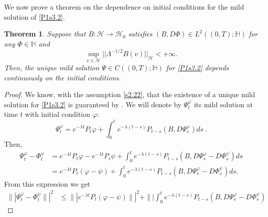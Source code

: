 \documentclass[]{interact}
\theoremstyle{plain}%
\newtheorem{theorem}{Theorem}[section]
\theoremstyle{definition}
\theoremstyle{remark}
\begin{document}
 We now prove a theorem on the dependence on initial conditions for the mild
solution of \eqref{P1s3.2}.
    \begin{theorem}
        \label{Cont-Mild-Sol}
        Suppose that 
        $B:
            \mathcal{H}
            \rightarrow 
            \mathcal{H}_0
        $ satisfies 
        $(B,D\Phi)\in L^2((0,T);\mathbb{H})$ 
        for any $\Phi\in\mathbb{H}$ and
        \begin{equation}\label{s2.22}
            \sup_{v\in \mathcal{H}} 
            ||\Lambda^{-1/2}B(v)||_{\mathcal{H}}<+\infty.
        \end{equation}
        Then, the unique mild solution $\Psi\in C((0,T); \mathbb{H})$ for
        \eqref{P1s3.2} depends continuously on the initial conditions.
    \end{theorem}
    \begin{proof}
        We know, with the assumption \eqref{s2.22}, that the existence of a 
        unique mild solution for \eqref{P1s3.2} is guaranteed by
        . We will denote by $\Psi_t^\varphi$ its mild solution at 
        time $t$ with initial condition $\varphi$:
        \begin{equation*}
            \Psi_t^\varphi
            =   e^{-\lambda t} P_t  
            \varphi
            +  
            \int_0^t e^{-\lambda (t-s)} P_{t-s}
            (B,D\Psi_s^\varphi) ds \ .
        \end{equation*}
        Then,
        \begin{align*}
            \Psi_t^\varphi-\Phi_t^\psi
                &=  
                e^{-\lambda t} P_t \varphi -e^{-\lambda t} P_t
                \psi +
                \int_0^t 
                e^{-\lambda (t-s)}
                P_{t-s}(B,D\Psi_s^\varphi-D\Phi_s^\psi) ds
                \\
                &= 
                e^{-\lambda t} 
                P_t (\varphi - \psi) 
                + \int_0^t
                    e^{-\lambda(t-s)} P_{t-s} (B, D \Psi_s^\varphi - 
                    D\Phi_s^\psi) ds.
        \end{align*}
        From this expression we get
        \begin{align*}
            \|| 
                \Psi_t^\varphi - \Phi_t^\psi
            \||^2
            &\le 
            \| |
            e^{-\lambda t}
            P_t (\varphi - \psi)
            \||^2
            +
            \||
            \int_0^t 
                e^{-\lambda (t-s)}
                P_{t-s}
                (B,D\Psi_s^\varphi-D\Phi_s^\psi) 

\end{align*}
\end{proof}
\end{document}
